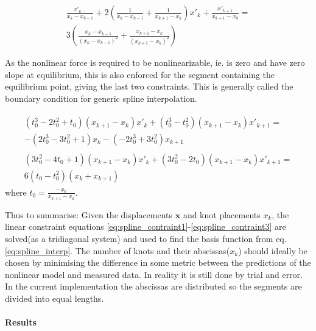 \begin{equation}
  \label{eq:spline_contraint1}
  \begin{aligned}
    \frac{x'_{k-}}{x_k-x_{k-1}} + 2 \left( \frac{1}{x_k-x_{k-1}} +
      \frac{1}{x_{k+1}-x_{k}} \right) x'_k + \frac{x'_{k+1}}{x_{k+1}-x_k} = \\
    3
    \left( \frac{x_k-x_{k-1}}{(x_k-x_{k-1})^2} +
      \frac{x_{k+1}-x_{k}}{(x_{k+1}-x_{k})^2} \right)
  \end{aligned}
\end{equation}

As the nonlinear force is required to be nonlinearizable, ie. is zero and have
zero slope at equilibrium, this is also enforced for the segment containing the
equilibrium point, giving the last two constraints. This is generally called the
boundary condition for generic spline interpolation.

\begin{align}
  \label{eq:spline_constraint2}
  \begin{aligned}
    (t_0^3 -2t_0^2 +t_0)(x_{k+1} - x_k)x'_k +
    (t_0^3-t_0^2)(x_{k+1} - x_k)x'_{k+1} = \\
    -(2t_0^3-3t_0^2+1)x_k -
    (-2t_0^3 +3t_0^2)x_{k+1}
  \end{aligned}\\
  \begin{aligned}
    (3t_0^2 -4t_0 +1)(x_{k+1} - x_k)x'_k +
    (3t_0^2-2t_0)(x_{k+1} - x_k)x'_{k+1} = \\
    6(t_0-t_0^2)(x_k + x_{k+1})
  \end{aligned}
  \label{eq:spline_contraint3}
\end{align}
where $t_0 = \frac{-x_k}{x_{k+1}-x_k}$.

Thus to summarise:
Given the displacements $\bm x$ and knot placements $x_k$, the linear constraint
equations \eqref{eq:spline_contraint1}-\eqref{eq:spline_contraint3} are
solved(as a tridiagonal system) and used to find the basis function from eq.
\eqref{eq:spline_interp}.
The number of knots and their abscissas($x_k$) should ideally be chosen by minimising
the difference in some metric between the predictions of the nonlinear model and
measured data. In reality it is still done by trial and error. In the current
implementation the abscissas are distributed so the segments are divided into
equal lengths.

\paragraph{Results}

